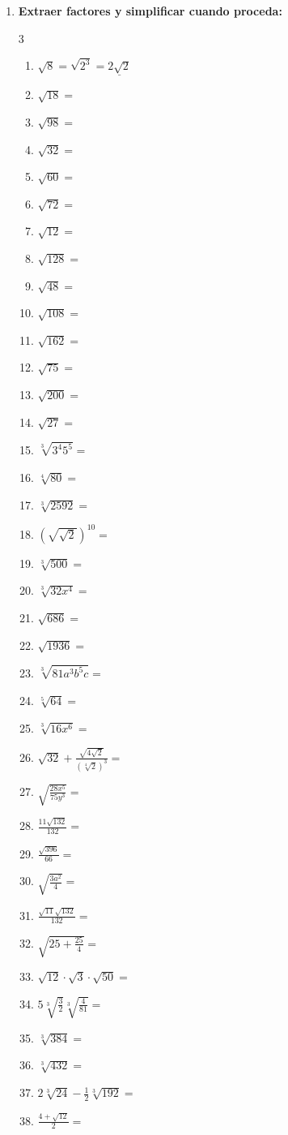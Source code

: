 \documentclass[10pt, a4paper]{article}
\begin{document}
\begin{enumerate}
    \item \textbf{Extraer factores y simplificar cuando proceda:}
    \begin{multicol}{3}
    \begin{enumerate}[label=\arabic*)]
        \item $\sqrt{8} = \sqrt{2^3} = \underline{2\sqrt{2}}$
        \item $\sqrt{18} =$
        \item $\sqrt{98} =$
        \item $\sqrt{32} =$
        \item $\sqrt{60} =$
        \item $\sqrt{72} =$
        \item $\sqrt{12} =$
        \item $\sqrt{128} =$
        \item $\sqrt{48} =$
        \item $\sqrt{108} =$
        \item $\sqrt{162} =$
        \item $\sqrt{75} =$
        \item $\sqrt{200} =$
        \item $\sqrt{27} =$
        \item $\sqrt[3]{3^4 5^5} =$
        \item $\sqrt[4]{80} =$
        \item $\sqrt[3]{2592} =$
        \item $(\sqrt{\sqrt{2}})^{10} =$
        \item $\sqrt[3]{500} =$
        \item $\sqrt[3]{32x^4} =$
        \item $\sqrt{686} =$
        \item $\sqrt{1936} =$
        \item $\sqrt[3]{81a^3 b^5 c} =$
        \item $\sqrt[5]{64} =$
        \item $\sqrt[3]{16x^6} =$
        \item $\sqrt{32} + \frac{\sqrt{4\sqrt{2}}}{(\sqrt[4]{2})^3} =$
        \item $\sqrt{\frac{28x^5}{75y^3}} =$
        \item $\frac{11\sqrt{132}}{132} =$
        \item $\frac{\sqrt{396}}{66} =$
        \item $\sqrt{\frac{3a^2}{4}} =$
        \item $\frac{\sqrt{11}\sqrt{132}}{132} =$
        \item $\sqrt{25 + \frac{25}{4}} =$
        \item $\sqrt{12}\cdot\sqrt{3}\cdot\sqrt{50} =$
        \item $5\sqrt[3]{\frac{3}{2}}\sqrt[3]{\frac{4}{81}} =$
        \item $\sqrt[3]{384} =$
        \item $\sqrt[3]{432} =$
        \item $2\sqrt[3]{24} - \frac{1}{2}\sqrt[3]{192} =$
        \item $\frac{4+\sqrt{12}}{2} =$
    \end{enumerate}
    \end{multicol}


\end{enumerate}
\end{document}
